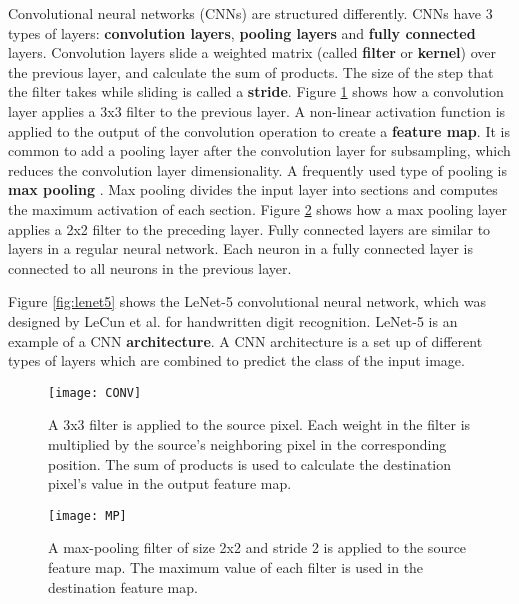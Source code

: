 Convolutional neural networks (CNNs) are structured differently. CNNs have 3 types of layers: \textbf{convolution layers}, \textbf{pooling layers} and \textbf{fully connected} layers. Convolution layers slide a weighted matrix (called \textbf{filter} or \textbf{kernel}) over the previous layer, and calculate the sum of products. The size of the step that the filter takes while sliding is called a \textbf{stride}. Figure \ref{fig:CONV} shows how a convolution layer applies a 3x3 filter to the previous layer. A non-linear activation function is applied to the output of the convolution operation to create a \textbf{feature map}. It is common to add a pooling layer after the convolution layer for subsampling, which reduces the convolution layer dimensionality. A frequently used type of pooling is \textbf{max pooling} \cite{weng1992cresceptron}. Max pooling divides the input layer into sections and computes the maximum activation of each section. Figure \ref{fig:MP} shows how a max pooling layer applies a 2x2 filter to the preceding layer. Fully connected layers are similar to layers in a regular neural network. Each neuron in a fully connected layer is connected to all neurons in the previous layer.

Figure \ref{fig:lenet5} shows the LeNet-5 convolutional neural network, which was designed by LeCun et al. \cite{lecun1998gradient} for handwritten digit recognition. LeNet-5 is an example of a CNN \textbf{architecture}. A CNN architecture is a set up of different types of layers which are combined to predict the class of the input image.

\begin{figure}[H]
\centering
\texttt{[image: CONV]}
\caption[A 3x3 filter is applied to the source pixel. Each weight in the filter is multiplied by the source's neighboring pixel in the corresponding position. The sum of products is used to calculate the destination pixel's value in the output feature map.]{A 3x3 filter is applied to the source pixel. Each weight in the filter is multiplied by the source's neighboring pixel in the corresponding position. The sum of products is used to calculate the destination pixel's value in the output feature map.\footnotemark}
\label{fig:CONV}
\end{figure}

\begin{figure}[H]
\centering
\texttt{[image: MP]}
\caption[A max-pooling filter of size 2x2 and stride 2 is applied to the source feature map. The maximum value of each filter is used in the destination feature map.]{A max-pooling filter of size 2x2 and stride 2 is applied to the source feature map. The maximum value of each filter is used in the destination feature map.\footnotemark}
\label{fig:MP}
\end{figure}


